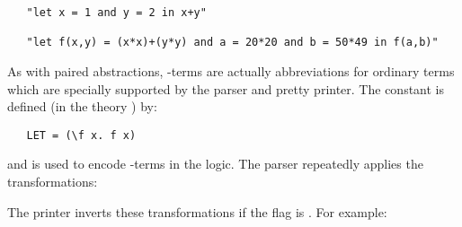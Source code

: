 \begin{hol}\begin{verbatim}
   "let x = 1 and y = 2 in x+y"

   "let f(x,y) = (x*x)+(y*y) and a = 20*20 and b = 50*49 in f(a,b)"
\end{verbatim}\end{hol}

As with paired abstractions, -terms are actually abbreviations for
ordinary  terms which are specially supported by the parser and pretty printer.
The constant  is defined (in the theory ) by:

\begin{hol}
\begin{verbatim}
   LET = (\f x. f x)
\end{verbatim}\end{hol}

\noindent and is used to encode -terms in the logic. The parser
repeatedly applies the transformations:

\bigskip

\noindent
{\small{}}

\bigskip


\noindent The printer inverts these transformations if the flag
 is .  For example:

